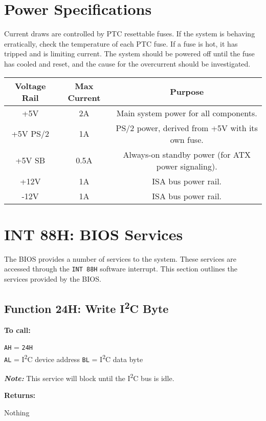 \documentclass[twoside,10pt,letterpaper]{refart}
\newcommand{\forceindent}[1][3em]{\leavevmode{\parindent=#1\indent}}
\newcommand{\itwoc}{I\textsuperscript{2}C}
\begin{document}
\section{Power Specifications}

Current draws are controlled by PTC resettable fuses. If the system is behaving erratically,
check the temperature of each PTC fuse. If a fuse is hot, it has tripped and is limiting current.
The system should be powered off until the fuse has cooled and reset, and the cause for the overcurrent
should be investigated.

\begin{center}
\begin{tabular}{ c|c|c  }
 \hline
 \textbf{Voltage Rail}   & \textbf{Max Current}    & \textbf{Purpose} \\
 \hline
 +5V & 2A & Main system power for all components. \\
 +5V PS/2 & 1A & PS/2 power, derived from +5V with its own fuse. \\
 +5V SB & 0.5A & Always-on standby power (for ATX power signaling). \\
 +12V & 1A & ISA bus power rail. \\
 -12V & 1A & ISA bus power rail. \\
\end{tabular}
\end{center}

\section{INT 88H:  BIOS Services} \label{bios}
The  BIOS provides a number of services to the system. These services are accessed through the \texttt{INT 88H}
software interrupt. This section outlines the services provided by the  BIOS.

\subsection{Function 24H: Write \itwoc{} Byte}
\textbf{To call:}

\forceindent \texttt{AH} = \texttt{24H} \\
\forceindent \texttt{AL} = \itwoc{} device address
\forceindent \texttt{BL} = \itwoc{} data byte

\forceindent \textit{\textbf{Note:}} This service will block until the \itwoc{} bus is idle.

\textbf{Returns:}

\forceindent Nothing
\end{document}
